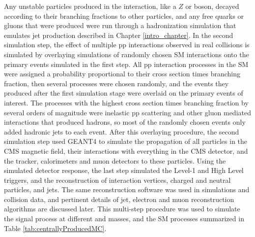Any unstable particles produced in the interaction, like a $Z$ or \WR boson, decayed according to 
their branching fractions to other particles, and any free quarks or gluons that were produced were 
run through a hadronization simulation that emulates jet production described in Chapter \ref{intro_chapter}.  In the second 
simulation step, the effect of multiple pp interactions observed in real collisions is simulated by 
overlaying simulations of randomly chosen SM interactions onto the primary events simulated in the first 
step.  All pp interaction processes in the SM were assigned a probability proportional to their cross section 
times branching fraction, then several processes were chosen randomly, and the events they produced after 
the first simulation stage were overlaid on the primary events of interest.  The processes with the highest cross section times 
branching fraction by several orders of magnitude were inelastic pp scattering and 
other gluon mediated interactions that produced hadrons, so most of the randomly chosen events only added 
hadronic jets to each event.  After this overlaying procedure, the second simulation step used GEANT4 \cite{geant4} to simulate 
the propagation of all particles in the CMS magnetic field, their interactions with everything in the CMS detector, 
and the tracker, calorimeters and muon detectors to these particles.  Using the simulated detector response, 
the last step simulated the Level-1 and High Level triggers, and the reconstruction of interaction 
vertices, charged and neutral particles, and jets.  The same reconstruction software 
was used in simulations and collision data, and pertinent details of jet, electron and muon reconstruction 
algorithms are discussed later.  This multi-step procedure 
was used to simulate the \WR signal process at different \mWR and \mnul masses, and the SM processes 
summarized in Table \ref{tab:centrallyProducedMC}.


